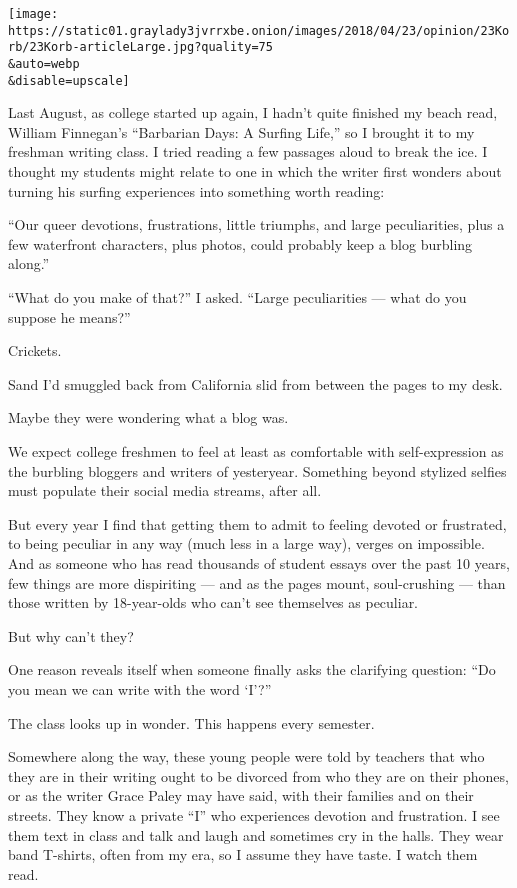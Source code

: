 \texttt{[image: https://static01.graylady3jvrrxbe.onion/images/2018/04/23/opinion/23Korb/23Korb-articleLarge.jpg?quality=75\\\&auto=webp\\\&disable=upscale]}

Last August, as college started up again, I hadn't quite finished my
beach read, William Finnegan's ``Barbarian Days: A Surfing Life,'' so I
brought it to my freshman writing class. I tried reading a few passages
aloud to break the ice. I thought my students might relate to one in
which the writer first wonders about turning his surfing experiences
into something worth reading:

``Our queer devotions, frustrations, little triumphs, and large
peculiarities, plus a few waterfront characters, plus photos, could
probably keep a blog burbling along.''

``What do you make of that?'' I asked. ``Large peculiarities --- what do
you suppose he means?''

Crickets.

Sand I'd smuggled back from California slid from between the pages to my
desk.

Maybe they were wondering what a blog was.

We expect college freshmen to feel at least as comfortable with
self-expression as the burbling bloggers and writers of yesteryear.
Something beyond stylized selfies must populate their social media
streams, after all.

But every year I find that getting them to admit to feeling devoted or
frustrated, to being peculiar in any way (much less in a large way),
verges on impossible. And as someone who has read thousands of student
essays over the past 10 years, few things are more dispiriting --- and
as the pages mount, soul-crushing --- than those written by 18-year-olds
who can't see themselves as peculiar.

But why can't they?

One reason reveals itself when someone finally asks the clarifying
question: ``Do you mean we can write with the word `I'?''

The class looks up in wonder. This happens every semester.

Somewhere along the way, these young people were told by teachers that
who they are in their writing ought to be divorced from who they are on
their phones, or as the writer Grace Paley may have said, with their
families and on their streets. They know a private ``I'' who experiences
devotion and frustration. I see them text in class and talk and laugh
and sometimes cry in the halls. They wear band T-shirts, often from my
era, so I assume they have taste. I watch them read.

